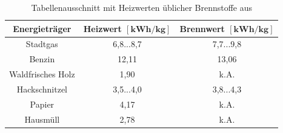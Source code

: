 \vspace*{-3.5mm}
\renewcommand{\arraystretch}{1.2}
\begin{table}[h!]
	\centering
	\caption[Tabellenausschnitt mit Heizwerten üblicher Brennstoffe]{Tabellenausschnitt mit Heizwerten üblicher Brennstoffe aus \cite{S.Furkus.}}
	\label{tab:heizwerte}
	\begin{tabulary}{\textwidth}{C|CC}
		\hline
		\textbf{Energieträger} & \textbf{Heizwert $\boldsymbol{\left[\si{\kWh\per\kg}\right]}$} & \textbf{Brennwert $\boldsymbol{\left[\si{\kWh\per\kg}\right]}$} \\ 
		\hline
		Stadtgas			&	6,8...8,7	&	7,7...9,8\\
		Benzin				&	12,11	&	13,06\\
		Waldfrisches Holz	&	1,90	&	k.A.\\
		Hackschnitzel		&	3,5...4,0	&	3,8...4,3\\
		Papier 				& 	4,17 	&	k.A. \\	
		Hausmüll			&	2,78	&	k.A.\\
		\hline
	\end{tabulary}
\end{table}
\FloatBarrier
\vspace*{-2.5mm}

